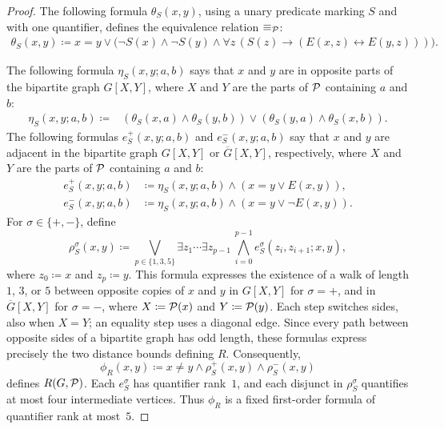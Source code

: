 \begin{proof}
    The following formula $\theta_S(x,y)$, using a unary predicate marking $S$ and with one quantifier,  defines the equivalence relation $\equiv_\mathcal P$:
    \begin{align}\label{eq:definableEquiv}
        \theta_S(x,y) \coloneqq
        x = y \lor \bigl(\neg S(x) \land \neg S(y) \land
        \forall z\,(S(z) \to (E(x,z) \leftrightarrow E(y,z)))\bigr).    
    \end{align}
    
    

    
  The following formula $\eta_S(x,y;a,b)$ says that $x$ and $y$ are in opposite parts of the bipartite graph $G[X,Y]$, where $X$ and $Y$ are the parts of $\mathcal P$ containing $a$ and $b$:
\begin{align*}
  \eta_S(x,y;a,b)\coloneqq{}&
  (\theta_S(x,a)\land\theta_S(y,b))
  \lor(\theta_S(y,a)\land\theta_S(x,b)).
\end{align*}
The following formulas $e_S^+(x,y;a,b)$ and $e_S^-(x,y;a,b)$ 
 say that $x$ and $y$ are adjacent in the bipartite graph $G[X,Y]$ or $\overline G[X,Y]$, respectively, where $X$ and $Y$ are the parts of $\mathcal P$ containing $a$ and $b$:
\begin{align*}
  e_S^+(x,y;a,b)&\coloneqq \eta_S(x,y;a,b)\land(x=y\lor E(x,y)),\\
  e_S^-(x,y;a,b)&\coloneqq \eta_S(x,y;a,b)\land(x=y\lor \neg E(x,y)).
\end{align*}
For $\sigma\in\{+,-\}$, define
\[
  \rho_S^\sigma(x,y)\coloneqq
  \bigvee_{p\in\{1,3,5\}}
  \exists z_1\cdots\exists z_{p-1}\,
  \bigwedge_{i=0}^{p-1}e_S^\sigma(z_i,z_{i+1};x,y),
\]
where $z_0\coloneqq x$ and $z_p\coloneqq y$.
This formula expresses the existence of a walk of length $1$, $3$, or $5$
between opposite copies of $x$ and $y$ in $G[X,Y]$ for $\sigma=+$, and
in $\overline G[X,Y]$ for $\sigma=-$, where $X\coloneqq \mathcal P(x)$ and $Y\coloneqq \mathcal P(y)$.
Each step switches sides, also when $X=Y$; an equality step uses a diagonal edge.
Since every path between opposite sides of a bipartite graph has odd length,
these formulas express precisely the two distance bounds defining $R$.
Consequently,
\[
  \phi_R(x,y)\coloneqq
  x\ne y\land\rho_S^+(x,y)\land\rho_S^-(x,y)
\]
defines $R(G,\mathcal P)$.
Each $e_S^\sigma$ has quantifier rank~$1$, and each disjunct in
$\rho_S^\sigma$ quantifies at most four intermediate vertices.
Thus $\phi_R$ is a fixed first-order formula of quantifier rank at most~$5$.
\end{proof}


